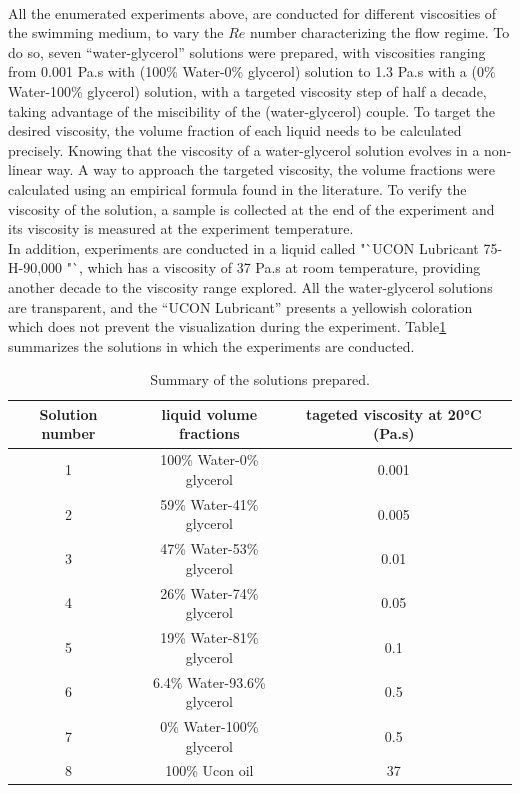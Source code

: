 \paragraph{}
All the enumerated experiments above, are conducted for different viscosities of the swimming medium, to vary the $Re$ number characterizing the flow regime. To do so, seven "`water-glycerol"' solutions were prepared, with viscosities ranging from 0.001 Pa.s with (100\% Water-0\% glycerol) solution  to 1.3 Pa.s with a (0\% Water-100\% glycerol) solution, with a targeted viscosity step of half a decade, taking advantage of the miscibility of the (water-glycerol) couple. To target the desired viscosity, the volume fraction of each liquid needs to be calculated precisely. Knowing that the viscosity of a water-glycerol solution evolves in a non-linear way\cite{viscositynonlinearCheng}. A way to approach the targeted viscosity, the volume fractions were calculated using an empirical formula found in the literature\cite{viscositynonlinearCheng}. To verify the viscosity of the solution, a sample is collected at the end of the experiment and its viscosity is measured at the experiment temperature.\\
In addition, experiments are conducted in a liquid called "`UCON Lubricant 75-H-90,000 "`, which has a viscosity of 37 Pa.s at room temperature, providing another decade to the viscosity range explored. All the water-glycerol solutions are transparent, and the "`UCON Lubricant"' presents a yellowish coloration which does not prevent the visualization during the experiment. 
Table\ref{tab:viscosities} summarizes the solutions in which the experiments are conducted.
\begin{table}[H]
	\centering
		\begin{adjustbox}{width=\textwidth}
			\begin{tabular}{|c|c|c|c|}
				\hline
				Solution number & liquid volume fractions & tageted viscosity at 20°C (Pa.s)\\
				\hline
				1&100\% Water-0\% glycerol&0.001\\
				2&59\% Water-41\% glycerol&0.005\\
				3&47\% Water-53\% glycerol&0.01\\
				4&26\% Water-74\% glycerol&0.05\\
				5&19\% Water-81\% glycerol&0.1\\
				6&6.4\% Water-93.6\% glycerol&0.5\\
				7&0\% Water-100\% glycerol&0.5\\
				8&100\% Ucon oil&37\\
				\hline
			\end{tabular}
		\end{adjustbox}
	\caption{Summary of the solutions prepared.}
	\label{tab:viscosities}
\end{table}
  
